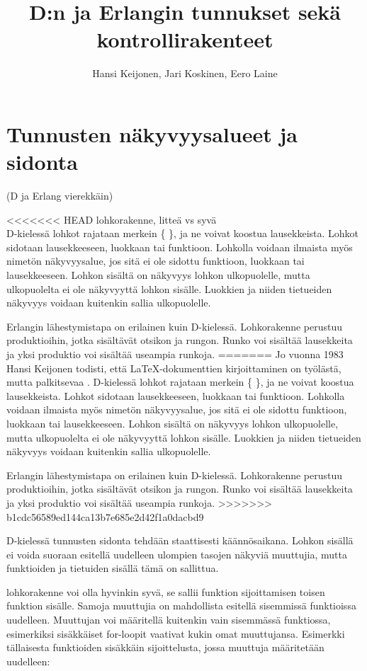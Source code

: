 \documentclass[11pt,oneside,a4paper]{article}
\title{D:n ja Erlangin tunnukset sekä kontrollirakenteet}
\author{Hansi Keijonen, Jari Koskinen, Eero Laine}
\begin{document}
\maketitle



\section{Tunnusten näkyvyysalueet ja sidonta}
(D ja Erlang vierekkäin)

<<<<<<< HEAD
lohkorakenne, litteä vs syvä \\
D-kielessä lohkot rajataan merkein \{ \}, ja ne voivat koostua lausekkeista.
Lohkot sidotaan lausekkeeseen, luokkaan tai funktioon. Lohkolla voidaan ilmaista
myös nimetön näkyvyysalue, jos sitä ei ole sidottu funktioon, luokkaan tai
lausekkeeseen. Lohkon sisältä on näkyvyys lohkon ulkopuolelle, mutta
ulkopuolelta ei ole näkyvyyttä lohkon sisälle. Luokkien ja niiden tietueiden
näkyvyys voidaan kuitenkin sallia ulkopuolelle.

Erlangin lähestymistapa on erilainen kuin D-kielessä. Lohkorakenne perustuu
produktioihin, jotka sisältävät otsikon ja rungon. Runko voi sisältää
lausekkeita ja yksi produktio voi sisältää useampia runkoja.
=======
Jo vuonna 1983 Hansi Keijonen todisti, että LaTeX-dokumenttien kirjoittaminen on työlästä, mutta palkitsevaa \cite{KEI83}.
D-kielessä lohkot rajataan merkein \{ \}, ja ne voivat koostua lausekkeista. Lohkot sidotaan lausekkeeseen, luokkaan tai funktioon. Lohkolla voidaan ilmaista myös nimetön näkyvyysalue, jos sitä ei ole sidottu funktioon, luokkaan tai lausekkeeseen. Lohkon sisältä on näkyvyys lohkon ulkopuolelle, mutta ulkopuolelta ei ole näkyvyyttä lohkon sisälle. Luokkien ja niiden tietueiden näkyvyys voidaan kuitenkin sallia ulkopuolelle.

Erlangin lähestymistapa on erilainen kuin D-kielessä. Lohkorakenne perustuu produktioihin, jotka sisältävät otsikon ja rungon. Runko voi sisältää lausekkeita ja yksi produktio voi sisältää useampia runkoja. 
>>>>>>> b1cdc56589ed144ca13b7e685e2d42f1a0dacbd9

D-kielessä tunnusten sidonta tehdään staattisesti käännösaikana. Lohkon sisällä
ei voida suoraan esitellä uudelleen ulompien tasojen näkyviä muuttujia, mutta
funktioiden ja tietuiden sisällä tämä on sallittua.

 lohkorakenne voi olla hyvinkin syvä, se sallii funktion sijoittamisen toisen
funktion sisälle. Samoja muuttujia on mahdollista esitellä sisemmissä
funktioissa uudelleen. Muuttujan voi määritellä kuitenkin vain sisemmässä
funktiossa, esimerkiksi sisäkkäiset for-loopit vaativat kukin omat muuttujansa.
Esimerkki tällaisesta funktioiden sisäkkäin sijoittelusta, jossa muuttuja
määritetään uudelleen:
\end{document}
